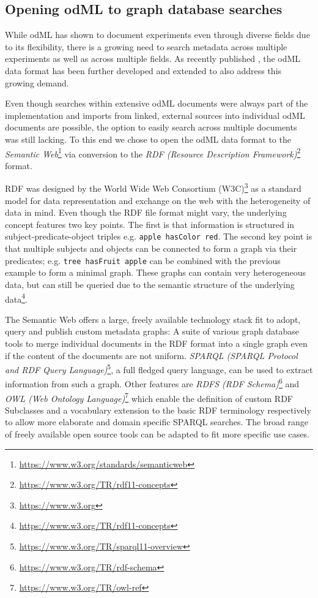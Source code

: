 \documentclass{article}
\begin{document}
\subsection{Opening odML to graph database searches} \label{sec:why_rdf}

While odML has shown to document experiments even through diverse fields due to its flexibility, there is a growing need to search metadata across multiple experiments as well as across multiple fields. As recently published \cite{Sprenger_2019}, the odML data format has been further developed and extended to also address this growing demand.

Even though searches within extensive odML documents were always part of the implementation and imports from linked, external sources into individual odML documents are possible, the option to easily search across multiple documents was still lacking. To this end we chose to open the odML data format to the \textit{Semantic Web}\footnote{\url{https://www.w3.org/standards/semanticweb}} via conversion to the \textit{RDF (Resource Description Framework)}\footnote{\url{https://www.w3.org/TR/rdf11-concepts}} format.

RDF was designed by the World Wide Web Consortium (W3C)\footnote{\url{https://www.w3.org}} as a standard model for data representation and exchange on the web with the heterogeneity of data in mind. Even though the RDF file format might vary, the underlying concept features two key points. The first is that information is structured in subject-predicate-object triples e.g. \texttt{apple hasColor red}. The second key point is that multiple subjects and objects can be connected to form a graph via their predicates; e.g. \texttt{tree hasFruit apple} can be combined with the previous example to form a minimal graph. These graphs can contain very heterogeneous data, but can still be queried due to the semantic structure of the underlying data\footnote{\url{https://www.w3.org/TR/rdf11-concepts}}.

The Semantic Web offers a large, freely available technology stack fit to adopt, query and publish custom metadata graphs: A suite of various graph database tools to merge individual documents in the RDF format into a single graph even if the content of the documents are not uniform. \textit{SPARQL (SPARQL Protocol and RDF Query Language)}\footnote{\url{https://www.w3.org/TR/sparql11-overview}}, a full fledged query language, can be used to extract information from such a graph. Other features are \textit{RDFS (RDF Schema)}\footnote{\url{https://www.w3.org/TR/rdf-schema}} and \textit{OWL (Web Ontology Language)}\footnote{\url{https://www.w3.org/TR/owl-ref}} which enable the definition of custom RDF Subclasses and a vocabulary extension to the basic RDF terminology respectively to allow more elaborate and domain specific SPARQL searches. The broad range of freely available open source tools can be adapted to fit more specific use cases.
\end{document}

